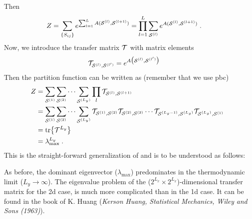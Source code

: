 Then 
%
\begin{align*}
Z &= \sum_{\{S_{ij}\}} e^{\sum_{l=1}^{L} A({ \mathbf {\cal S}^{(l)}},{ \mathbf {\cal S}^{(l+1)}}) }
 = \prod_{l=1}^{L} \sum_{{ \mathbf {\cal S}^{(l)}}}  e^{ A({ \mathbf {\cal S}^{(l)}},{ \mathbf {\cal S}^{(l+1)}}) }\;.
\end{align*}
%
Now, we introduce the transfer matrix ${\cal T}$ with matrix elements
%
\begin{align*}
{\cal T}_{{ \mathbf {\cal S}^{(l)}},{ \mathbf {\cal S}^{(l')}}} &= e^{A\big({ \mathbf {\cal S}^{(l)}},{ \mathbf {\cal S}^{(l')}}\big)}
\end{align*}
%
Then the partition function can be written as (remember that we use pbc)
%
\begin{align*}
Z &= \sum_{{ \mathbf {\cal S}^{(1)}}} \sum_{{ \mathbf {\cal S}^{(2)}}}\cdots  \sum_{{ \mathbf {\cal S}^{(L_{y})}}}\prod_{l} {\cal T}_{{ \mathbf {\cal S}^{(l)}},{ \mathbf {\cal S}^{(l+1)}}}\\
&= \sum_{{ \mathbf {\cal S}^{(1)}}} \sum_{{ \mathbf {\cal S}^{(2)}}}\cdots  \sum_{{ \mathbf {\cal S}^{(L_{y})}}} {\cal T}_{{ \mathbf {\cal S}^{(1)}},{ \mathbf {\cal S}^{(2)}}}{\cal T}_{{ \mathbf {\cal S}^{(2)}},{ \mathbf {\cal S}^{(3)}}}\cdots {\cal T}_{{ \mathbf {\cal S}^{(L_{y}-1)}},{ \mathbf {\cal S}^{(L_{y})}}}
 {\cal T}_{{ \mathbf {\cal S}^{(L_{y})}},{ \mathbf {\cal S}^{(1)}}}\\
&= \tr{{\cal T}^{L_{y}}} \\
&= \lambda_\text{max}^{L_{y}}\;.
\end{align*}
%
This is the straight-forward generalization of 
and  is to be understood as follows: 

%


%
As before, the dominant eigenvector ($\lambda_\text{max}$) predominates in the thermodynamic limit ($L_{y}\to \infty$). The eigenvalue problem
of the  ($2^{L_{x}}\times 2^{L_{x}}$)-dimensional transfer matrix for the 2d case, is much more complicated than  in the
1d case. It can be found in the book of K. Huang
({\em Kerson Huang, Statistical Mechanics, Wiley and Sons (1963)}).

